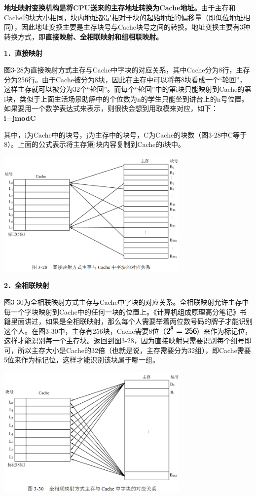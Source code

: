 \textbf{地址映射变换机构是将CPU送来的主存地址转换为Cache地址。}由于主存和Cache的块大小相同，块内地址都是相对于块的起始地址的偏移量（即低位地址相同），因此地址变换主要是主存块号与Cache块号之间的转换。地址变换主要有3种转换方式，即{\textbf{直接映射、全相联映射和组相联映射。}}

\textbf{1．直接映射}

图3-28为直接映射方式主存与Cache中字块的对应关系，其中Cache分为8行，主存分为256行。由于Cache被分为8块，因此在主存中可以将每8块看成一个``轮回''，这样主存就可以被分为32个``轮回''。而每个``轮回''中的第i块只能映射到Cache的第i块，类似于上面生活场景助解中的个位数为n的学生只能坐到讲台上的n号位置。如果要用一个数学表达式来表示，则很快会想到用取模来对应，如下：\\

\textbf{i=jmodC}

其中，i为Cache中的块号，j为主存中的块号，C为Cache的块数（图3-28中C等于8）。上面的公式表示将主存第j块内容复制到Cache的i块中。

\includegraphics[width=3.69792in,height=2.43750in]{png-jpeg-pics/86BE8C5EE2A04D9E7E6BD8010BFCC50D.png}

\textbf{2．全相联映射}

图3-30为全相联映射方式主存与Cache中字块的对应关系。全相联映射允许主存中每一个字块映射到Cache中的任何一块的位置上。《计算机组成原理高分笔记》书籍里面讲过，如果是全相联映射，那么每个人需要举着两位数号码的牌子才能识别这个人。在图3-30中，主存有256块，Cache需要8位（\includegraphics[width=0.64583in,height=0.15625in]{texmath/d8f4e828256}）来作为标记位，这样才能识别每一个主存块。返回到图3-28，因为直接映射只需要识别每个组号即可，所以主存大小是Cache的32倍（也就是说，主存需要分为32组），即Cache需要5位来作为标记位，这样才能识别该块属于哪一组。

\includegraphics[width=3.69792in,height=2.54167in]{png-jpeg-pics/745532CB27FBE35BABB980604360E67C.png}

